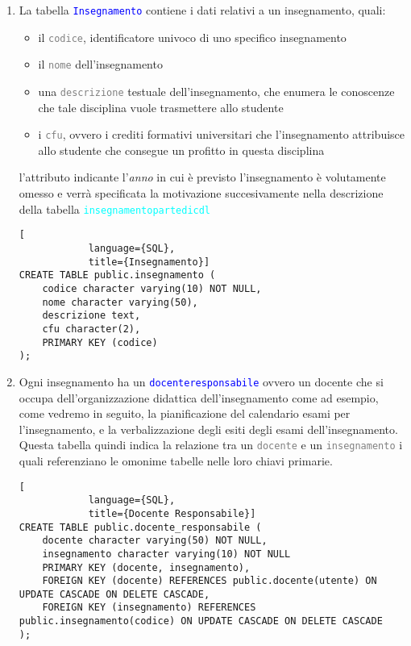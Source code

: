 \documentclass{article}
\newcommand{\tabb}[1]{\texttt{\textcolor{blue}{#1}}}
\newcommand{\tab}[1]{\texttt{\textcolor{cyan}{#1}}}
\newcommand{\attr}[1]{\texttt{\textcolor{gray}{#1}}}
\newcommand{\und}[0]{\textunderscore}
\newcommand{\alert}[0]{\textcolor{red}{\faExclamationCircle}}
\begin{document}
\begin{enumerate}
        \item La tabella \tabb{Insegnamento} contiene i dati relativi a un insegnamento, quali:
        \begin{itemize}
            \item il \attr{codice}, identificatore univoco di uno specifico insegnamento
            \item il \attr{nome} dell'insegnamento
            \item una \attr{descrizione} testuale dell'insegnamento, che enumera le conoscenze che tale disciplina vuole trasmettere allo studente
            \item i \attr{cfu}, ovvero i crediti formativi universitari che l'insegnamento attribuisce allo studente che consegue un profitto in questa disciplina
        \end{itemize}
        \alert l'attributo indicante l'\textit{anno} in cui è previsto l'insegnamento è volutamente omesso e verrà specificata la motivazione succesivamente nella descrizione della tabella \tab{insegnamento\und parte\und di\und cdl}
        \begin{lstlisting}[
            language={SQL},
            title={Insegnamento}]
CREATE TABLE public.insegnamento (
    codice character varying(10) NOT NULL,
    nome character varying(50),
    descrizione text,
    cfu character(2),
    PRIMARY KEY (codice)
);
        \end{lstlisting}

        \item Ogni insegnamento ha un \tabb{docente\und responsabile} ovvero un docente che si occupa dell'organizzazione didattica dell'insegnamento come ad esempio, come vedremo in seguito, la pianificazione del calendario esami per l'insegnamento, e la verbalizzazione degli esiti degli esami dell'insegnamento.
        Questa tabella quindi indica la relazione tra un \attr{docente} e un \attr{insegnamento} i quali referenziano le omonime tabelle nelle loro chiavi primarie.
        \begin{lstlisting}[
            language={SQL},
            title={Docente Responsabile}]
CREATE TABLE public.docente_responsabile (
    docente character varying(50) NOT NULL,
    insegnamento character varying(10) NOT NULL
    PRIMARY KEY (docente, insegnamento),
    FOREIGN KEY (docente) REFERENCES public.docente(utente) ON UPDATE CASCADE ON DELETE CASCADE,
    FOREIGN KEY (insegnamento) REFERENCES public.insegnamento(codice) ON UPDATE CASCADE ON DELETE CASCADE
);
        \end{lstlisting}


\end{enumerate}
\end{document}
